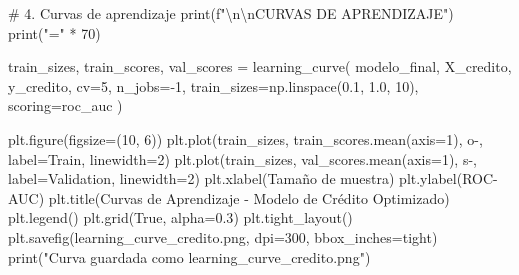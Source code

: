 \documentclass[
  doc,
  floatsintext,
  longtable,
  a4paper,
  nolmodern,
  notxfonts,
  notimes,
  12pt,
  colorlinks=true,linkcolor=blue,citecolor=blue,urlcolor=blue]{apa7}
\newenvironment{Shaded}{\begin{snugshade}}{\end{snugshade}}
\newcommand{\BuiltInTok}[1]{\textcolor[rgb]{0.00,0.23,0.31}{#1}}
\newcommand{\CharTok}[1]{\textcolor[rgb]{0.13,0.47,0.30}{#1}}
\newcommand{\CommentTok}[1]{\textcolor[rgb]{0.37,0.37,0.37}{#1}}
\newcommand{\DecValTok}[1]{\textcolor[rgb]{0.68,0.00,0.00}{#1}}
\newcommand{\FloatTok}[1]{\textcolor[rgb]{0.68,0.00,0.00}{#1}}
\newcommand{\NormalTok}[1]{\textcolor[rgb]{0.00,0.23,0.31}{#1}}
\newcommand{\OperatorTok}[1]{\textcolor[rgb]{0.37,0.37,0.37}{#1}}
\newcommand{\SpecialStringTok}[1]{\textcolor[rgb]{0.13,0.47,0.30}{#1}}
\newcommand{\StringTok}[1]{\textcolor[rgb]{0.13,0.47,0.30}{#1}}
\newcommand{\VariableTok}[1]{\textcolor[rgb]{0.07,0.07,0.07}{#1}}
\begin{document}
\begin{Shaded}
\begin{Highlighting}[]
\CommentTok{\# 4. Curvas de aprendizaje}
\BuiltInTok{print}\NormalTok{(}\SpecialStringTok{f"}\CharTok{\textbackslash{}n\textbackslash{}n}\SpecialStringTok{CURVAS DE APRENDIZAJE"}\NormalTok{)}
\BuiltInTok{print}\NormalTok{(}\StringTok{"="} \OperatorTok{*} \DecValTok{70}\NormalTok{)}

\NormalTok{train\_sizes, train\_scores, val\_scores }\OperatorTok{=}\NormalTok{ learning\_curve(}
\NormalTok{    modelo\_final, X\_credito, y\_credito,}
\NormalTok{    cv}\OperatorTok{=}\DecValTok{5}\NormalTok{,}
\NormalTok{    n\_jobs}\OperatorTok{={-}}\DecValTok{1}\NormalTok{,}
\NormalTok{    train\_sizes}\OperatorTok{=}\NormalTok{np.linspace(}\FloatTok{0.1}\NormalTok{, }\FloatTok{1.0}\NormalTok{, }\DecValTok{10}\NormalTok{),}
\NormalTok{    scoring}\OperatorTok{=}\StringTok{\textquotesingle{}roc\_auc\textquotesingle{}}
\NormalTok{)}

\NormalTok{plt.figure(figsize}\OperatorTok{=}\NormalTok{(}\DecValTok{10}\NormalTok{, }\DecValTok{6}\NormalTok{))}
\NormalTok{plt.plot(train\_sizes, train\_scores.mean(axis}\OperatorTok{=}\DecValTok{1}\NormalTok{), }\StringTok{\textquotesingle{}o{-}\textquotesingle{}}\NormalTok{, label}\OperatorTok{=}\StringTok{\textquotesingle{}Train\textquotesingle{}}\NormalTok{, linewidth}\OperatorTok{=}\DecValTok{2}\NormalTok{)}
\NormalTok{plt.plot(train\_sizes, val\_scores.mean(axis}\OperatorTok{=}\DecValTok{1}\NormalTok{), }\StringTok{\textquotesingle{}s{-}\textquotesingle{}}\NormalTok{, label}\OperatorTok{=}\StringTok{\textquotesingle{}Validation\textquotesingle{}}\NormalTok{, linewidth}\OperatorTok{=}\DecValTok{2}\NormalTok{)}
\NormalTok{plt.xlabel(}\StringTok{\textquotesingle{}Tamaño de muestra\textquotesingle{}}\NormalTok{)}
\NormalTok{plt.ylabel(}\StringTok{\textquotesingle{}ROC{-}AUC\textquotesingle{}}\NormalTok{)}
\NormalTok{plt.title(}\StringTok{\textquotesingle{}Curvas de Aprendizaje {-} Modelo de Crédito Optimizado\textquotesingle{}}\NormalTok{)}
\NormalTok{plt.legend()}
\NormalTok{plt.grid(}\VariableTok{True}\NormalTok{, alpha}\OperatorTok{=}\FloatTok{0.3}\NormalTok{)}
\NormalTok{plt.tight\_layout()}
\NormalTok{plt.savefig(}\StringTok{\textquotesingle{}learning\_curve\_credito.png\textquotesingle{}}\NormalTok{, dpi}\OperatorTok{=}\DecValTok{300}\NormalTok{, bbox\_inches}\OperatorTok{=}\StringTok{\textquotesingle{}tight\textquotesingle{}}\NormalTok{)}
\BuiltInTok{print}\NormalTok{(}\StringTok{"Curva guardada como \textquotesingle{}learning\_curve\_credito.png\textquotesingle{}"}\NormalTok{)}


\end{Highlighting}
\end{Shaded}
\end{document}
